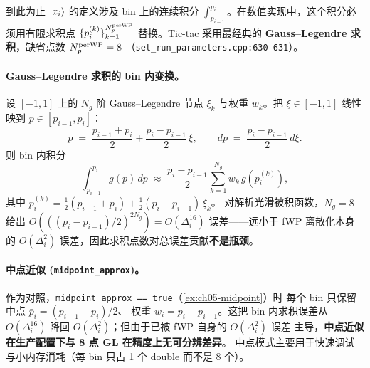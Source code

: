 到此为止 \(\ket{x_{i}}\) 的定义涉及 bin 上的连续积分
\(\int_{p_{i-1}}^{p_i}\)。在数值实现中，这个积分必须用有限求积点
\(\{p_i^{(k)}\}_{k=1}^{N_p^{\rm per WP}}\) 替换。Tic-tac 采用最经典的
\textbf{Gauss--Legendre 求积}，缺省点数 \(N_p^{\rm per WP} = 8\)
（\texttt{set\_run\_parameters.cpp:630--631}）。

\paragraph{Gauss--Legendre 求积的 bin 内变换。}
设 \([-1, 1]\) 上的 \(N_g\) 阶 Gauss--Legendre 节点 \(\xi_k\) 与权重
\(w_k\)。把 \(\xi \in [-1, 1]\) 线性映到 \(p \in [p_{i-1}, p_i]\)：
\begin{equation}
\label{eq:ch05-GL-affine}
p \;=\; \frac{p_{i-1} + p_i}{2}
   + \frac{p_i - p_{i-1}}{2}\,\xi,
\qquad
dp \;=\; \frac{p_i - p_{i-1}}{2}\,d\xi.
\end{equation}
则 bin 内积分
\begin{equation}
\int_{p_{i-1}}^{p_i} g(p)\,dp
\;\approx\;
\frac{p_i - p_{i-1}}{2}\sum_{k=1}^{N_g} w_k\,g\!\left(p_i^{(k)}\right),
\end{equation}
其中
\(p_i^{(k)} = \tfrac{1}{2}(p_{i-1} + p_i) + \tfrac{1}{2}(p_i - p_{i-1})\,\xi_k\)。
对解析光滑被积函数，\(N_g = 8\) 给出 \(O\!\left(((p_i-p_{i-1})/2)^{2 N_g}\right)
= O(\Delta_i^{16})\) 误差——远小于 fWP 离散化本身的 \(O(\Delta_i^2)\)
误差，因此求积点数对总误差贡献\textbf{不是瓶颈}。

\paragraph{中点近似 (\texttt{midpoint\_approx})。}
作为对照，\texttt{midpoint\_approx == true}（\cref{ex:ch05-midpoint}）时
每个 bin 只保留中点 \(\bar{p}_i = (p_{i-1} + p_i)/2\)、
权重 \(w_i = p_i - p_{i-1}\)。这把 bin 内求积误差从 \(O(\Delta_i^{16})\)
降回 \(O(\Delta_i^{2})\)；但由于已被 fWP 自身的 \(O(\Delta_i^2)\) 误差
主导，\textbf{中点近似在生产配置下与 8 点 GL 在精度上无可分辨差异}。
中点模式主要用于快速调试与小内存消耗（每 bin 只占 1 个 double 而不是 8 个）。

